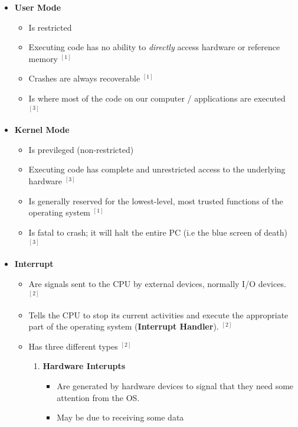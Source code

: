 \documentclass[12pt]{article}
\begin{document}
\begin{enumerate}[1.]
    \begin{itemize}
        \item \textbf{User Mode}

        \begin{itemize}
            \item Is restricted
            \item Executing code has no ability to \textit{directly} access
            hardware or reference memory $^{[1]}$
            \item Crashes are always recoverable $^{[1]}$
            \item Is where most of the code on our computer / applications are executed $^{[3]}$
        \end{itemize}

        \item \textbf{Kernel Mode}
        \begin{itemize}
            \item Is previleged (non-restricted)
            \item Executing code has complete and unrestricted access to the underlying hardware $^{[3]}$
            \item Is generally reserved for the lowest-level, most trusted functions of the operating
            system $^{[1]}$
            \item Is fatal to crash; it will halt the entire PC (i.e the blue screen of death) $^{[3]}$
        \end{itemize}

        \item \textbf{Interrupt}

        \begin{itemize}
            \item Are signals sent to the CPU by external devices, normally I/O devices. $^{[2]}$
            \item Tells the CPU to stop its current activities and execute the appropriate part of the operating system (\textbf{Interrupt Handler}). $^{[2]}$
            \item Has three different types $^{[2]}$

            \begin{enumerate}[1)]
                \item \textbf{Hardware Interupts}

                \begin{itemize}
                    \item Are generated by hardware devices to signal that they need some attention from the OS.
                    \item May be due to receiving some data


\end{itemize}
\end{enumerate}
\end{itemize}
\end{itemize}
\end{enumerate}
\end{document}
